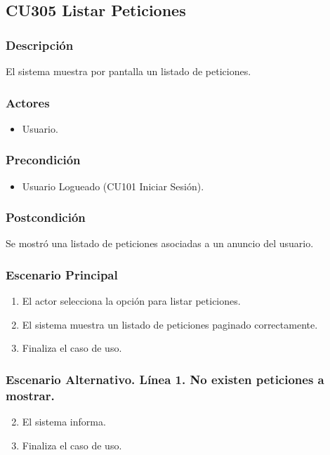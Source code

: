 \subsection{CU305 Listar Peticiones}
\subsubsection{Descripci\'{o}n}
El sistema muestra por pantalla un listado de peticiones.
\subsubsection{Actores}
\begin{itemize}
\item Usuario.
\end{itemize}
\subsubsection{Precondici\'{o}n}
\begin{itemize}
\item Usuario Logueado (CU101 Iniciar Sesi\'{o}n).
\end{itemize}
\subsubsection{Postcondici\'{o}n}
Se mostr\'{o} una listado de peticiones asociadas a un anuncio del usuario.
\subsubsection{Escenario Principal}
\begin{enumerate}
\item El actor selecciona la opci\'{o}n para listar peticiones.
\item El sistema muestra un listado de peticiones paginado correctamente.
\item Finaliza el caso de uso.
\end{enumerate}
\subsubsection{Escenario Alternativo. L\'{i}nea 1. No existen peticiones a mostrar.}
\begin{enumerate}
\setcounter{enumi}{1}
\item El sistema informa.
\item Finaliza el caso de uso.
\end{enumerate}
